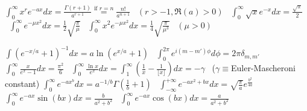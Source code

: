 {$\int_0^\infty\!x^re^{-ax}dx{=}\frac{\Gamma(r{+}1)}{a^{r+1}}\stackrel{\text{if }r{=}n}{=}\frac{n!}{a^{n+1}}$ \ {\scriptsize$(r{>}{-}1,\Re(a){>}0)$} \
$\int_0^\infty\!\sqrt{x}e^{-x}dx{=}\frac{\sqrt{\pi}}{2}$ \
$\int_0^\infty\!e^{-\mu x^2}dx{=}\frac{1}{2}\sqrt{\frac{\pi}{\mu}}$ \
$\int_0^\infty\!x^2e^{-\mu x^2}dx{=}\frac{1}{4}\sqrt{\frac{\pi}{\mu^3}}$ \ {\scriptsize$(\mu{>}0)$}

$\int\!(e^{-x/a}{+}1)^{-1}dx{=}a\ln(e^{x/a}{+}1)$ \
$\int_0^{2\pi}\!e^{i(m-m')\phi}d\phi{=}2\pi\delta_{m,m'}$ \
$\int_0^\infty\!\frac{x}{e^x{-}1}dx{=}\frac{\pi^2}{6}$ \
$\int_0^\infty\!\frac{\ln x}{e^x}dx{=}\int_1^\infty\!\left(\frac{1}{x}{-}\frac{1}{\lfloor x\rfloor}\right)dx{=}{-}\gamma$ \ ($\gamma{\equiv}$Euler-Mascheroni constant)
$\int_0^\infty\!e^{-ax^b}dx{=}a^{-1/b}\Gamma\left(\frac{1}{b}{+}1\right)$ \ $\int_{-\infty}^{+\infty}\!e^{-ax^2{+}bx}dx{=}\sqrt{\frac{\pi}{a}}e^{\frac{b^2}{4a}}$\\
$\int_0^\infty\!e^{-ax}\sin(bx)dx{=}\frac{b}{a^2{+}b^2}$ \
$\int_0^\infty\!e^{-ax}\cos(bx)dx{=}\frac{a}{a^2{+}b^2}$ 
}